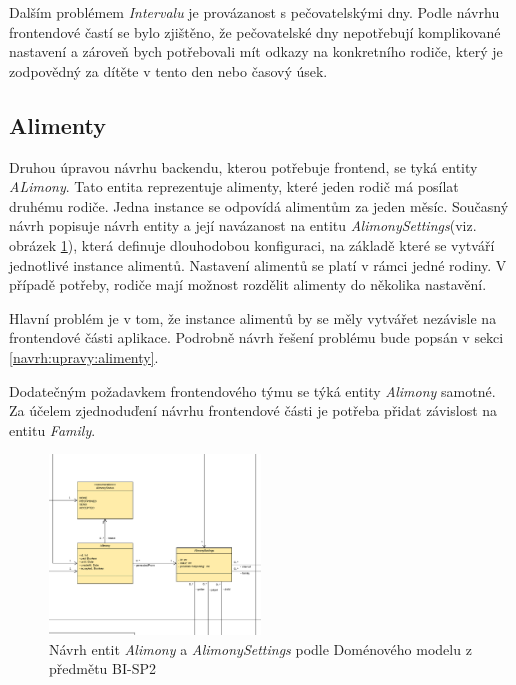         Dalším problémem \textit{Intervalu} je provázanost s pečovatelskými dny. Podle návrhu frontendové častí se bylo zjištěno, že pečovatelské dny nepotřebují komplikované nastavení a zároveň bych potřebovali mít odkazy na konkretního rodiče, který je zodpovědný za dítěte v tento den nebo časový úsek.
    
    \subsection{Alimenty}
        Druhou úpravou návrhu backendu, kterou potřebuje frontend, se tyká entity \textit{ALimony}.
        Tato entita reprezentuje alimenty, které jeden rodič má posílat druhému rodiče. Jedna instance se odpovídá alimentům za jeden měsíc. Současný návrh popisuje návrh entity a její navázanost na entitu \textit{AlimonySettings}(viz. obrázek \ref{image:aliomny-draft1}), která definuje dlouhodobou konfiguraci, na základě které se vytváří jednotlivé instance alimentů. Nastavení alimentů se platí v rámci jedné rodiny. V případě potřeby, rodiče mají možnost rozdělit alimenty do několika nastavění. 
        
        Hlavní problém je v tom, že instance alimentů by se měly vytvářet nezávisle na frontendové části aplikace. Podrobně návrh řešení problému bude popsán v sekci \ref{navrh:upravy:alimenty}.
        
        Dodatečným požadavkem frontendového týmu se týká entity \textit{Alimony} samotné. Za účelem zjednoduďení návrhu frontendové části je potřeba přidat závislost na entitu \textit{Family}. %
        \begin{figure}\centering
	        \includegraphics[width=0.5\textwidth]{pdfs/AlimonyDraft1}
	        \caption[Návrh \textit{Alimony} a \textit{AlimonySettings}]{Návrh entit \textit{Alimony} a \textit{AlimonySettings} podle Doménového modelu z předmětu BI-SP2}\label{image:aliomny-draft1}
        \end{figure}
        

